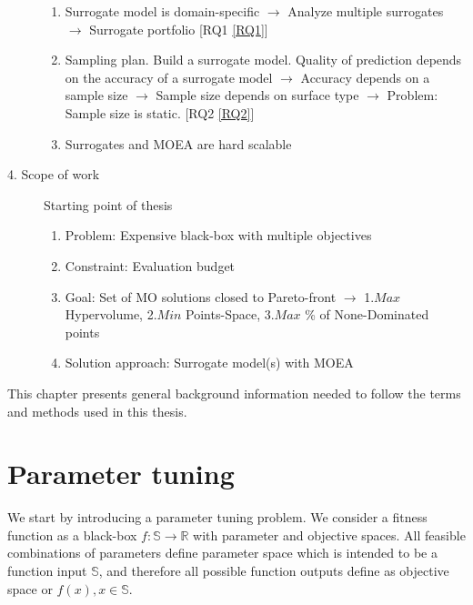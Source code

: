 \begin{blockquote}
\begin{description}
\begin{enumerate}
                    \item Surrogate model is domain-specific $\rightarrow$ Analyze multiple surrogates $\rightarrow$ Surrogate portfolio [RQ1 \ref{RQ1}]
                    \item Sampling plan. Build a surrogate model. Quality of prediction depends on the accuracy of a surrogate model  $\rightarrow$ Accuracy depends on a sample size $\rightarrow$ Sample size depends on surface type $\rightarrow$ Problem: Sample size is static. [RQ2 \ref{RQ2}]
                    \item Surrogates and MOEA are hard scalable 
                \end{enumerate}
            \item[4. Scope of work] Starting point of thesis
                \begin{enumerate}
                    \item Problem: Expensive black-box with multiple objectives
                    \item Constraint: Evaluation budget
                    \item Goal: Set of MO solutions closed to Pareto-front $\rightarrow$ 1.$Max$ Hypervolume, 2.$Min$ Points-Space, 3.$Max$ \% of None-Dominated points 
                    \item Solution approach: Surrogate model(s) with MOEA
                \end{enumerate}
        \end{description}
    \end{blockquote}

    This chapter presents general background information needed to follow the terms and methods used in this thesis. 

    \section{Parameter tuning}
        We start by introducing a parameter tuning problem. We consider a fitness function as a black-box $f : \mathbb{S} \rightarrow \mathbb{R}$ with parameter and objective spaces. All feasible combinations of parameters define parameter space which is intended to be a function input $\mathbb{S}$, and therefore all possible function outputs define as objective space or $f(x), x \in \mathbb{S}$. 

